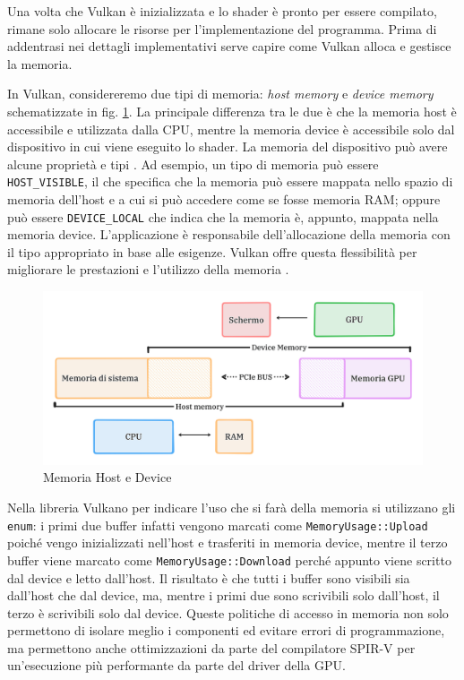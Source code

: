 Una volta che Vulkan è inizializzata e lo shader è pronto per essere compilato, rimane solo allocare le risorse per l'implementazione del programma. Prima di addentrasi nei dettagli implementativi serve capire come Vulkan alloca e gestisce la memoria.


In Vulkan, considereremo due tipi di memoria: \textit{host memory} e \textit{device memory} schematizzate in fig. \ref{fig:host_device_mem}. La principale differenza tra le due è che la memoria host è accessibile e utilizzata dalla CPU, mentre la memoria device è accessibile solo dal dispositivo in cui viene eseguito lo shader. La memoria del dispositivo può avere alcune proprietà e tipi \cite[]{KG:VulkanGuide}. Ad esempio, un tipo di memoria può essere \verb|HOST_VISIBLE|, il che specifica che la memoria può essere mappata nello spazio di memoria dell'host e a cui si può accedere come se fosse memoria RAM; oppure può essere \verb|DEVICE_LOCAL| che indica che la memoria è, appunto, mappata nella memoria device. L'applicazione è responsabile dell'allocazione della memoria con il tipo appropriato in base alle esigenze. Vulkan offre questa flessibilità per migliorare le prestazioni e l'utilizzo della memoria \cite[]{KG:MemoryFlag}.

\begin{figure}[ht]
    \centering
    \includegraphics[width=.9\linewidth]{images/chapter2/host_device_mem.png}
    \caption{Memoria Host e Device}
    \label{fig:host_device_mem}
\end{figure}

Nella libreria Vulkano per indicare l'uso che si farà della memoria si utilizzano gli \verb|enum|: i primi due buffer infatti vengono marcati come \verb|MemoryUsage::Upload| poiché vengo inizializzati nell'host e trasferiti in memoria device, mentre il terzo buffer viene marcato come \verb|MemoryUsage::Download| perché appunto viene scritto dal device e letto dall'host. Il risultato è che tutti i buffer sono visibili sia dall'host che dal device, ma, mentre i primi due sono scrivibili solo dall'host, il terzo è scrivibili solo dal device. Queste politiche di accesso in memoria non solo permettono di isolare meglio i componenti ed evitare errori di programmazione, ma permettono anche ottimizzazioni da parte del compilatore SPIR-V per un'esecuzione più performante da parte del driver della GPU.

